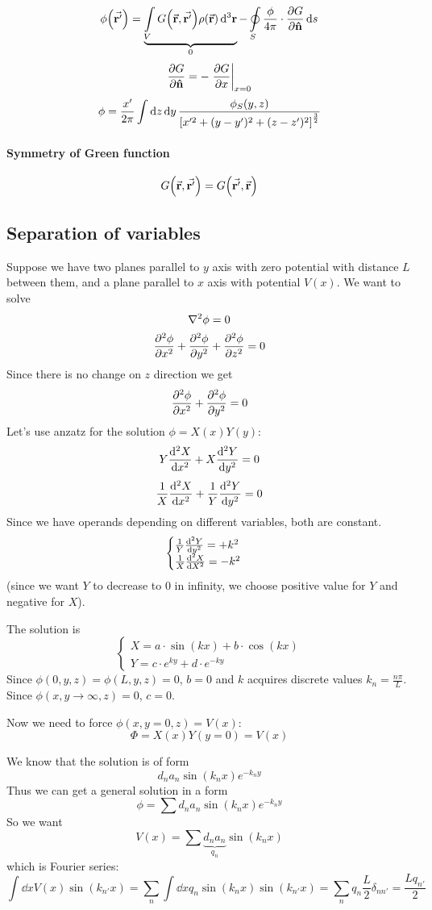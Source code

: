 
$$ \phi\qty(\va{r'}) = \underbrace{\int\limits_V    G \qty(\va{r}, \va{r'})\rho\qty(\va{r}) \dd[3]{\vb{r}}}_{0} - \oint\limits_S  \frac{\phi }{4\pi}\cdot \pdv{G}{\vu{n}} \dd{s} $$
$$\pdv{G}{\vu{n}} = -\eval{\pdv{G}{x}}_{x=0}$$
$$\phi = \frac{x'}{2\pi} \int \dd{z} \dd{y} \frac{\phi_S(y,z)}{\qty[x'^2 + (y-y')^2 + (z-z')^2]^{\frac{3}{2}}}$$
\paragraph{Symmetry of Green function}
$$G \qty(\va{r}, \va{r'}) = G \qty(\va{r'}, \va{r})$$

\subsection{Separation of variables}

Suppose we have two planes parallel to $y$ axis with zero potential with distance $L$ between them, and a plane parallel to $x$ axis with potential $V(x)$. We want to solve
$$\laplacian{ \phi} = 0$$
$$\pdv[2]{\phi}{x}+\pdv[2]{\phi}{y}+\pdv[2]{\phi}{z}=0$$
Since there is no change on $z$ direction we get
$$\pdv[2]{\phi}{x}+\pdv[2]{\phi}{y}=0$$
Let's use anzatz for the solution $\phi = X(x)Y(y)$:
$$Y\dv[2]{X}{x} + X\dv[2]{Y}{y} = 0$$
$$\frac{1}{X}\dv[2]{X}{x} + \frac{1}{Y}\dv[2]{Y}{y} = 0$$
Since we have operands depending on different variables, both are constant.
$$\begin{cases}
\frac{1}{Y}\dv[2]{Y}{y} = +k^2\\
\frac{1}{X}\dv[2]{X}{X} = -k^2\\
\end{cases}$$
(since we want $Y$ to decrease to $0$ in infinity, we choose positive value for $Y$ and negative for $X$).

The solution is
$$\begin{cases}
X = a \cdot \sin(kx) + b \cdot \cos(kx)\\
Y = c \cdot e^{ky} + d \cdot e^{-ky}
\end{cases}$$
Since $\phi(0,y,z) = \phi(L,y,z) = 0$, $b=0$ and $k$ acquires discrete values $k_n = \frac{n\pi }{L}$.
Since $\phi(x, y\to \infty, z) = 0$, $c=0$.

Now we need to force $\phi(x,y=0,z)=V(x)$:
$$\Phi = X(x)Y(y=0) = V(x)$$

We know that the solution is of form
$$d_na_n \sin (k_nx) e^{-k_ny}$$
Thus we can get a general solution in a form
$$\phi = \sum d_na_n \sin(k_n x) e^{-k_ny}$$
So we want
$$V(x) = \sum \underbrace{d_na_n}_{q_n} \sin(k_nx)$$
which is Fourier series:
$$\int \dd{x} V(x) \sin(k_{n'}x) = \sum_{n} \int \dd{x} q_n \sin(k_nx) \sin(k_{n'}x) = \sum_n q_n \frac{L}{2} \delta_{nn'} = \frac{Lq_{n'}}{2} $$

